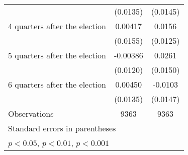 \begin{table}[htbp]
\begin{tabular}{l*{2}{c}}
                    &    (0.0135)         &    (0.0145)         \\
[1em]
 4 quarters after the election&     0.00417         &      0.0156         \\
                    &    (0.0155)         &    (0.0125)         \\
[1em]
 5 quarters after the election&    -0.00386         &      0.0261         \\
                    &    (0.0120)         &    (0.0150)         \\
[1em]
 6 quarters after the election&     0.00450         &     -0.0103         \\
                    &    (0.0135)         &    (0.0147)         \\
\hline
Observations        &        9363         &        9363         \\
\hline\hline
\multicolumn{3}{l}{\footnotesize Standard errors in parentheses}\\
\multicolumn{3}{l}{\footnotesize \sym{*} \(p<0.05\), \sym{**} \(p<0.01\), \sym{***} \(p<0.001\)}\\
\end{tabular}
\end{table}
